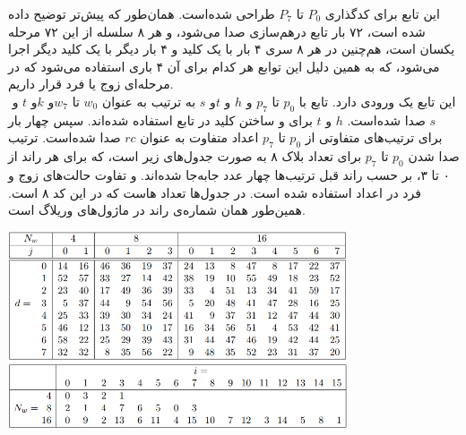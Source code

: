 این تابع برای کدگذاری $ P_0 $ تا $ P_7 $ طراحی شده‌است. همان‌طور که پیش‌تر توضیح داده شده است، ۷۲ بار تابع درهم‌سازی صدا می‌شود،‌ و هر ۸ سلسله از این ۷۲ مرحله یکسان است، هم‌چنین در هر ۸ سری ۴ بار با یک کلید و ۴ بار دیگر با یک کلید دیگر اجرا می‌شود،‌ که به همین دلیل این توابع  هر کدام برای آن ۴ باری استفاده می‌شود که در مرحله‌ای زوج یا فرد قرار داریم.
\\
این تابع یک ورودی   دارد. تابع  \hyperref[subsec:TFBIG-ADDKEY]{} با ‌$ p_0 $ تا  $ p_7 $ و $ h $ و $ t $و ‌$ s $ به ترتیب به عنوان  $ w_0 $ تا $ w_7 $و $ k $و ‌$ t $ و ‌$ s $ صدا شده‌است. ‌$ h $ و $ t $ برای  و ساختن کلید در تابع  استفاده شده‌اند.
سپس   \hyperref[subsec:TFBIG-MIX8]{}چهار بار برای ترتیب‌های متفاوتی از ‌$ p_0 $ تا $ p_7 $ اعداد متفاوت به عنوان $ rc $ صدا شده‌است. ترتیب صدا شدن $ p_0 $ تا $ p_7 $ برای تعداد بلاک ۸ به صورت جدول‌های زیر است،‌ که برای هر ‌‌راند از ۰ تا ۳، بر حسب راند قبل ترتیب‌ها چهار عدد جابه‌جا شده‌اند. و تفاوت حالت‌های زوج و فرد در اعداد استفاده شده است. در جدول‌ها  تعداد هاست که در این کد ۸ است. همین‌طور  همان شماره‌‌ی راند در ماژول‌های وریلاگ است.
\begin{center}
	\includegraphics[width=10cm]{images/table_mix.png}
	\includegraphics[width= 10cm]{images/Mix2.png}
\end{center}


\subsection{}
\label{subsec:TFBIG-ADDKEY}

